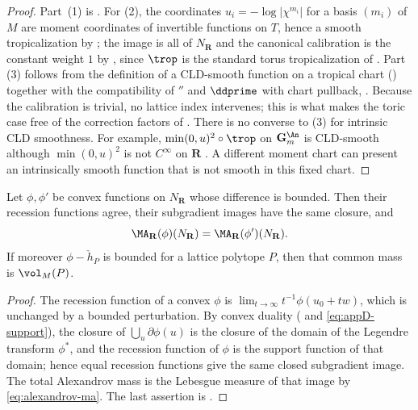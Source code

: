 \begin{proof}
Part~(1) is .  For (2), the coordinates
$u_i=-\log|\chi^{m_i}|$ for a basis $(m_i)$ of $M$ are moment coordinates of
invertible functions on $T$, hence a smooth tropicalization by
; the image is all of $N_{\mathbf R}$ and the
canonical calibration is the constant weight $1$ by
, since $\trop$ is the standard torus
tropicalization of .  Part (3) follows from the
definition of a CLD-smooth function on a tropical chart
() together with the compatibility of $\dprime$ and
$\ddprime$ with chart pullback, .  Because
the calibration is trivial, no lattice index intervenes; this is what makes
the toric case free of the correction factors of
.
There is no converse to (3) for intrinsic CLD smoothness.  For example,
$\min(0,u)^2\circ\trop$ on $\mathbf G_m^{\An}$ is CLD-smooth although
$\min(0,u)^2$ is not $C^\infty$ on $\mathbf R$
\cite[Example~2.3.5]{BGJKK25}.  A different moment chart can present an
intrinsically smooth function that is not smooth in this fixed chart.
\end{proof}

\begin{lemma}
\label{lem:ch19-toric-recession}
Let $\phi,\phi'$ be convex functions on $N_{\mathbf R}$ whose difference
is bounded.  Then their recession functions agree, their subgradient images
have the same closure, and
\[
 \MA_{\mathbf R}(\phi)(N_{\mathbf R})=\MA_{\mathbf R}(\phi')(N_{\mathbf R}).
\]
If moreover $\phi-\check h_P$ is bounded for a lattice polytope $P$, then
that common mass is $\vol_M(P)$.
\end{lemma}

\begin{proof}
The recession function of a convex $\phi$ is
$\lim_{t\to\infty}t^{-1}\phi(u_0+tw)$, which is unchanged by a bounded
perturbation.  By convex duality
( and \eqref{eq:appD-support}), the closure of
$\bigcup_u\partial\phi(u)$ is the closure of the domain of the Legendre transform
$\phi^*$, and the recession function of $\phi$ is the support function of
that domain; hence equal recession functions give the same closed subgradient
image.  The total Alexandrov mass is the Lebesgue measure of that image by
\eqref{eq:alexandrov-ma}.  The last assertion is
.
\end{proof}

